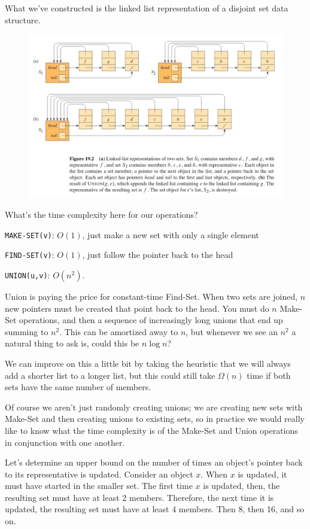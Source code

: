 \documentclass[]{article}
\begin{document}
    What we've constructed is the linked list representation of a disjoint set data structure. 

    \begin{figure}[h]
        \includegraphics[width=\textwidth]{linked-list.png}
    \end{figure}

    What's the time complexity here for our operations?

    \texttt{MAKE-SET(v)}: $O(1)$, just make a new set with only a single element

    \texttt{FIND-SET(v)}: $O(1)$, just follow the pointer back to the head
    
    \texttt{UNION(u,v)}: $O(n^2)$.

    Union is paying the price for constant-time Find-Set. When two sets are joined, $n$ new pointers must be created that point back to the head. You must do $n$ Make-Set operations, and then a sequence of increasingly long unions that end up summing to $n^2$. This can be amortized away to $n$, but whenever we see an $n^2$ a natural thing to ask is, could this be $n \log n$?

    We can improve on this a little bit by taking the heuristic that we will always add a shorter list to a longer list, but this could still take $\Omega(n)$ time if both sets have the same number of members. 

    Of course we aren't just randomly creating unions; we are creating new sets with Make-Set and then creating unions to existing sets, so in practice we would really like to know what the time complexity is of the Make-Set and Union operations in conjunction with one another. 

    Let's determine an upper bound on the number of times an object's pointer back to its representative is updated. Consider an object $x$. When $x$ is updated, it must have started in the smaller set. The first time $x$ is updated, then, the resulting set must have at least 2 members. Therefore, the next time it is updated, the resulting set must have at least 4 members. Then 8, then 16, and so on.
\end{document}
